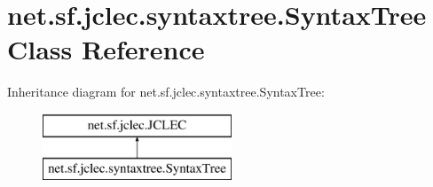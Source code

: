 \hypertarget{classnet_1_1sf_1_1jclec_1_1syntaxtree_1_1_syntax_tree}{\section{net.\-sf.\-jclec.\-syntaxtree.\-Syntax\-Tree Class Reference}
\label{classnet_1_1sf_1_1jclec_1_1syntaxtree_1_1_syntax_tree}
}
Inheritance diagram for net.\-sf.\-jclec.\-syntaxtree.\-Syntax\-Tree\-:\begin{figure}[H]
\begin{center}
\leavevmode
\includegraphics[height=2.000000cm]{classnet_1_1sf_1_1jclec_1_1syntaxtree_1_1_syntax_tree}
\end{center}
\end{figure}
